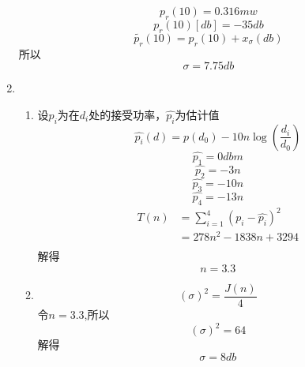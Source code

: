 \documentclass{article}
\begin{document}
\begin{enumerate}
          \begin{equation}
            p_r(10)=0.316mw
          \end{equation}
          \begin{equation}
            p_r(10)[db]=-35db
          \end{equation}
          \begin{equation}
            \tilde{p_r}(10)=p_r(10)+x_{\sigma}(db)
          \end{equation}
          所以
          \begin{equation}
            \sigma=7.75db
          \end{equation}
    \item \begin{enumerate}
      \item 设$p_i$为在$d_i$处的接受功率，$\hat{p_i}$为估计值
      \begin{equation}
        \hat{p_i}(d)=p(d_0)-10n\log(\frac{d_i}{d_0})
      \end{equation}           
      \begin{equation}
        \hat{p_1}=0dbm
      \end{equation}  
      \begin{equation}
        \hat{p_2}=-3n
      \end{equation} 
      \begin{equation}
        \hat{p_3}=-10n
      \end{equation} 
      \begin{equation}
        \hat{p_4}=-13n
      \end{equation}         
      \begin{align}
        T(n)&=\sum_{i=1}^{4}(p_i-\hat{p_i})^2\\
            &=278n^2-1838n+3294\\
      \end{align}              
      解得
      \begin{equation}
        n=3.3
      \end{equation}
      \item \begin{equation}
        (\sigma)^2=\frac{J(n)}{4}
       \end{equation}
       令$n=3.3$,所以
       \begin{equation}
        (\sigma)^2=64
       \end{equation}
       解得
       \begin{equation}
        \sigma=8db
       \end{equation}

\end{enumerate}
\end{enumerate}
\end{document}

